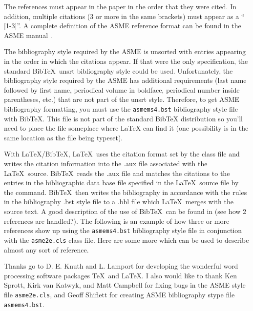 \documentclass[twocolumn,10pt]{asme2e}
\begin{document}
The references must appear in the paper in the order that they were cited.  In addition, multiple citations (3 or more in the same brackets) must appear as a `` [1-3]''.  A complete definition of the ASME reference format can be found in the  ASME manual \cite{asmemanual}.

The bibliography style required by the ASME is unsorted with entries appearing in the order in which the citations appear. If that were the only specification, the standard {\sc Bib}\TeX\ unsrt bibliography style could be used. Unfortunately, the bibliography style required by the ASME has additional requirements (last name followed by first name, periodical volume in boldface, periodical number inside parentheses, etc.) that are not part of the unsrt style. Therefore, to get ASME bibliography formatting, you must use the \verb+asmems4.bst+ bibliography style file with {\sc Bib}\TeX. This file is not part of the standard BibTeX distribution so you'll need to place the file someplace where LaTeX can find it (one possibility is in the same location as the file being typeset).

With \LaTeX/{\sc Bib}\TeX, \LaTeX\ uses the citation format set by the class file and writes the citation information into the .aux file associated with the \LaTeX\ source. {\sc Bib}\TeX\ reads the .aux file and matches the citations to the entries in the bibliographic data base file specified in the \LaTeX\ source file by the \verb++ command. {\sc Bib}\TeX\ then writes the bibliography in accordance with the rules in the bibliography .bst style file to a .bbl file which \LaTeX\ merges with the source text.  A good description of the use of {\sc Bib}\TeX\ can be found in \cite{latex, goosens} (see how 2 references are handled?).  The following is an example of how three or more references \cite{latex, asmemanual,  goosens} show up using the \verb+asmems4.bst+ bibliography style file in conjunction with the \verb+asme2e.cls+ class file. Here are some more \cite{art, blt, ibk, icn, ips, mts, mis, pro, pts, trt, upd} which can be used to describe almost any sort of reference.




\begin{acknowledgment}
Thanks go to D. E. Knuth and L. Lamport for developing the wonderful word processing software packages \TeX\ and \LaTeX. I also would like to thank Ken Sprott, Kirk van Katwyk, and Matt Campbell for fixing bugs in the ASME style file \verb+asme2e.cls+, and Geoff Shiflett for creating 
ASME bibliography stype file \verb+asmems4.bst+.
\end{acknowledgment}
\end{document}
